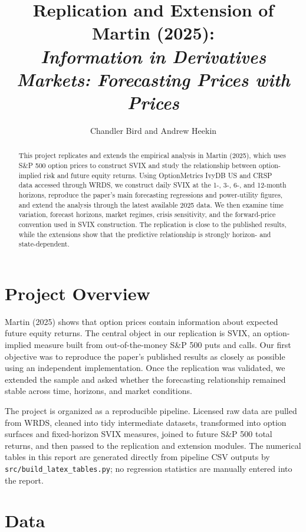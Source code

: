 \documentclass[11pt]{article}
\title{Replication and Extension of Martin (2025):\\
\textit{Information in Derivatives Markets: Forecasting Prices with Prices}}
\author{Chandler Bird and Andrew Heekin}
\date{}
\begin{document}
\maketitle

\begin{abstract}
This project replicates and extends the empirical analysis in Martin (2025), which uses S\&P 500 option prices to construct SVIX and study the relationship between option-implied risk and future equity returns. Using OptionMetrics IvyDB US and CRSP data accessed through WRDS, we construct daily SVIX at the 1-, 3-, 6-, and 12-month horizons, reproduce the paper's main forecasting regressions and power-utility figures, and extend the analysis through the latest available 2025 data. We then examine time variation, forecast horizons, market regimes, crisis sensitivity, and the forward-price convention used in SVIX construction. The replication is close to the published results, while the extensions show that the predictive relationship is strongly horizon- and state-dependent.
\end{abstract}

\section{Project Overview}

Martin (2025) shows that option prices contain information about expected future equity returns. The central object in our replication is SVIX, an option-implied measure built from out-of-the-money S\&P 500 puts and calls. Our first objective was to reproduce the paper's published results as closely as possible using an independent implementation. Once the replication was validated, we extended the sample and asked whether the forecasting relationship remained stable across time, horizons, and market conditions.

The project is organized as a reproducible pipeline. Licensed raw data are pulled from WRDS, cleaned into tidy intermediate datasets, transformed into option surfaces and fixed-horizon SVIX measures, joined to future S\&P 500 total returns, and then passed to the replication and extension modules. The numerical tables in this report are generated directly from pipeline CSV outputs by \texttt{src/build\_latex\_tables.py}; no regression statistics are manually entered into the report.

\section{Data}
\end{document}
